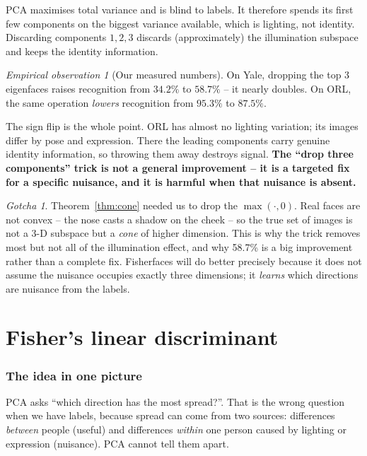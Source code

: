 \documentclass[11pt]{article}
\theoremstyle{definition}
\theoremstyle{remark}
\newtheorem*{gotcha}{Gotcha}
\newtheorem*{observation}{Empirical observation}
\begin{document}
PCA maximises total variance and is blind to labels. It therefore spends its first
few components on the biggest variance available, which is lighting, not identity.
Discarding components $1,2,3$ discards (approximately) the illumination subspace
and keeps the identity information.

\begin{observation}[Our measured numbers]
On Yale, dropping the top 3 eigenfaces raises recognition from
$\mathbf{34.2\%}$ to $\mathbf{58.7\%}$ -- it nearly doubles. On ORL, the same
operation \emph{lowers} recognition from $\mathbf{95.3\%}$ to $\mathbf{87.5\%}$.

The sign flip is the whole point. ORL has almost no lighting variation; its
images differ by pose and expression. There the leading components carry genuine
identity information, so throwing them away destroys signal. \textbf{The ``drop
three components'' trick is not a general improvement -- it is a targeted fix for a
specific nuisance, and it is harmful when that nuisance is absent.}
\end{observation}

\begin{gotcha}
Theorem~\ref{thm:cone} needed us to drop the $\max(\cdot,0)$. Real faces are not
convex -- the nose casts a shadow on the cheek -- so the true set of images is not
a 3-D subspace but a \emph{cone} of higher dimension. This is why the trick removes
most but not all of the illumination effect, and why 58.7\% is a big improvement
rather than a complete fix. Fisherfaces will do better precisely because it does
not assume the nuisance occupies exactly three dimensions; it \emph{learns} which
directions are nuisance from the labels.
\end{gotcha}

\part{Fisher's linear discriminant}

\section{The idea in one picture}

PCA asks ``which direction has the most spread?''. That is the wrong question when
we have labels, because spread can come from two sources: differences
\emph{between} people (useful) and differences \emph{within} one person caused by
lighting or expression (nuisance). PCA cannot tell them apart.
\end{document}

